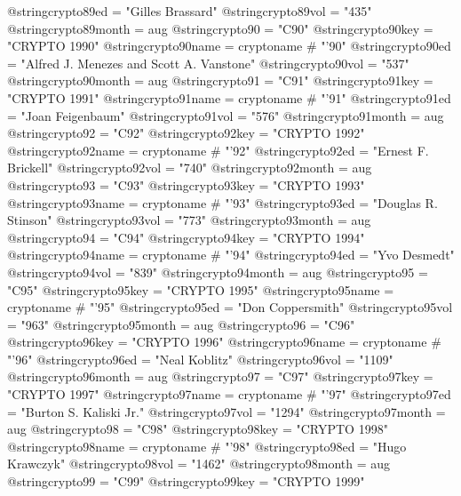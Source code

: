 @string{crypto89ed =            "Gilles Brassard"}
@string{crypto89vol =           "435"}
@string{crypto89month =         aug}
@string{crypto90 =              "C90"}
@string{crypto90key =           "CRYPTO 1990"}
@string{crypto90name =          cryptoname # "'90"}
@string{crypto90ed =            "Alfred J. Menezes and Scott A. Vanstone"}
@string{crypto90vol =           "537"}
@string{crypto90month =         aug}
@string{crypto91 =              "C91"}
@string{crypto91key =           "CRYPTO 1991"}
@string{crypto91name =          cryptoname # "'91"}
@string{crypto91ed =            "Joan Feigenbaum"}
@string{crypto91vol =           "576"}
@string{crypto91month =         aug}
@string{crypto92 =              "C92"}
@string{crypto92key =           "CRYPTO 1992"}
@string{crypto92name =          cryptoname # "'92"}
@string{crypto92ed =            "Ernest F. Brickell"}
@string{crypto92vol =           "740"}
@string{crypto92month =         aug}
@string{crypto93 =              "C93"}
@string{crypto93key =           "CRYPTO 1993"}
@string{crypto93name =          cryptoname # "'93"}
@string{crypto93ed =            "Douglas R. Stinson"}
@string{crypto93vol =           "773"}
@string{crypto93month =         aug}
@string{crypto94 =              "C94"}
@string{crypto94key =           "CRYPTO 1994"}
@string{crypto94name =          cryptoname # "'94"}
@string{crypto94ed =            "Yvo Desmedt"}
@string{crypto94vol =           "839"}
@string{crypto94month =         aug}
@string{crypto95 =              "C95"}
@string{crypto95key =           "CRYPTO 1995"}
@string{crypto95name =          cryptoname # "'95"}
@string{crypto95ed =            "Don Coppersmith"}
@string{crypto95vol =           "963"}
@string{crypto95month =         aug}
@string{crypto96 =              "C96"}
@string{crypto96key =           "CRYPTO 1996"}
@string{crypto96name =          cryptoname # "'96"}
@string{crypto96ed =            "Neal Koblitz"}
@string{crypto96vol =           "1109"}
@string{crypto96month =         aug}
@string{crypto97 =              "C97"}
@string{crypto97key =           "CRYPTO 1997"}
@string{crypto97name =          cryptoname # "'97"}
@string{crypto97ed =            "Burton S. {Kaliski Jr.}"}
@string{crypto97vol =           "1294"}
@string{crypto97month =         aug}
@string{crypto98 =              "C98"}
@string{crypto98key =           "CRYPTO 1998"}
@string{crypto98name =          cryptoname # "'98"}
@string{crypto98ed =            "Hugo Krawczyk"}
@string{crypto98vol =           "1462"}
@string{crypto98month =         aug}
@string{crypto99 =              "C99"}
@string{crypto99key =           "CRYPTO 1999"}
